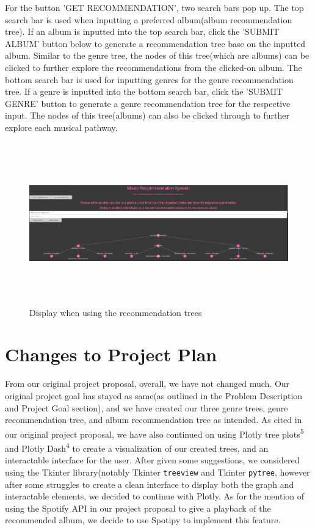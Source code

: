 \documentclass[fontsize=11pt]{article}
\begin{document}
For the button 'GET RECOMMENDATION', two search bars pop up. The top search bar is used when inputting a preferred album(album recommendation tree). If an album is inputted into the top search bar, click the 'SUBMIT ALBUM' button below to generate a recommendation tree base on the inputted album. Similar to the genre tree, the nodes of this tree(which are albums) can be clicked to further explore the recommendations from the clicked-on album. The bottom search bar is used for inputting genres for the genre recommendation tree. If a genre is inputted into the bottom search bar, click the 'SUBMIT GENRE' button to generate a genre recommendation tree for the respective input. The nodes of this tree(albums) can also be clicked through to further explore each musical pathway.

\begin{figure}[h]
    \centering
    \includegraphics[height=7cm, width=18cm]{examplerun.png}
    \caption{Display when using the recommendation trees}
    \label{fig:my_label}
\end{figure}

\section*{Changes to Project Plan}

From our original project proposal, overall, we have not changed much. Our original project goal has stayed as same(as outlined in the Problem Description and Project Goal section), and we have created our three genre trees, genre recommendation tree, and album recommendation tree as intended. As cited in our original project proposal, we have also continued on using Plotly tree plots\textsuperscript{5} and Plotly Dash\textsuperscript{4} to create a visualization of our created trees, and an interactable interface for the user. After given some suggestions, we considered using the Tkinter library(notably Tkinter \texttt{treeview} and Tkinter \texttt{pytree}, however after some struggles to create a clean interface to display both the graph and interactable elements, we decided to continue with Plotly. As for the mention of using the Spotify API in our project proposal to give a playback of the recommended album, we decide to use Spotipy to implement this feature. 
\end{document}
